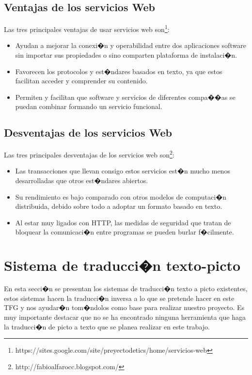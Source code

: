 \subsection{Ventajas de los servicios Web}
Las tres principales ventajas de usar servicios web son\footnote{https://sites.google.com/site/preyectodetics/home/servicios-web}:
\begin{itemize}
  \item Ayudan a mejorar la conexi�n y operabilidad entre dos aplicaciones software sin importar sus propiedades o sino comparten plataforma de instalaci�n.
  \item Favorecen los protocolos y est�ndares basados en texto, ya que estos facilitan acceder y comprender su contenido.
  \item Permiten y facilitan que software y servicios de diferentes compa��as se puedan combinar formando un servicio funcional.      
\end{itemize}

\subsection{Desventajas de los servicios Web}
Las tres principales desventajas de los servicios web son\footnote{http://fabioalfarocc.blogspot.com/}:
\begin{itemize}
  \item Las transacciones que llevan consigo estos servicios est�n mucho menos desarrolladas que otros est�ndares abiertos.
  \item Su rendimiento es bajo comparado con otros modelos de computaci�n distribuida, debido sobre todo a adoptar un formato basado en texto.
  \item Al estar muy ligados con HTTP, las medidas de seguridad que tratan de bloquear la comunicaci�n entre programas se pueden burlar f�cilmente.
\end{itemize} 

\section{Sistema de traducci�n texto-picto}
\label{cap2:sec:Sistema de traducci�n texto-picto}
En esta secci�n se presentan los sistemas de traducci�n texto a picto existentes, estos sistemas hacen la traducci�n inversa a lo que se pretende hacer en este TFG y nos ayudar�n tom�ndolos como base para realizar nuestro proyecto. Es muy importante destacar que no se ha encontrado ninguna herramienta que haga la traducci�n de picto a texto que se planea realizar en este trabajo.  

